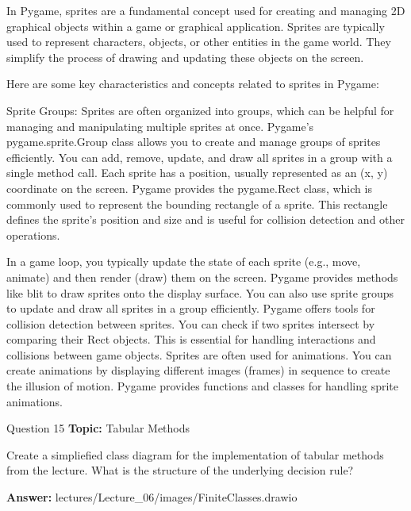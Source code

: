 \begin{frame}
    In Pygame, sprites are a fundamental concept used for creating and managing 2D graphical objects within a game or graphical application. Sprites are typically used to represent characters, objects, or other entities in the game world. They simplify the process of drawing and updating these objects on the screen.

Here are some key characteristics and concepts related to sprites in Pygame:

Sprite Groups: Sprites are often organized into groups, which can be helpful for managing and manipulating multiple sprites at once. Pygame's pygame.sprite.Group class allows you to create and manage groups of sprites efficiently. You can add, remove, update, and draw all sprites in a group with a single method call.
Each sprite has a position, usually represented as an (x, y) coordinate on the screen. Pygame provides the pygame.Rect class, which is commonly used to represent the bounding rectangle of a sprite. This rectangle defines the sprite's position and size and is useful for collision detection and other operations.
\end{frame}
\begin{frame}
    In a game loop, you typically update the state of each sprite (e.g., move, animate) and then render (draw) them on the screen. Pygame provides methods like blit to draw sprites onto the display surface. You can also use sprite groups to update and draw all sprites in a group efficiently.
    Pygame offers tools for collision detection between sprites. You can check if two sprites intersect by comparing their Rect objects. This is essential for handling interactions and collisions between game objects.
    Sprites are often used for animations. You can create animations by displaying different images (frames) in sequence to create the illusion of motion. Pygame provides functions and classes for handling sprite animations.
\end{frame}

\begin{frame}{Question 15}
    \textbf{Topic:} Tabular Methods
    \vspace{10pt}

    Create a simpliefied class diagram for the implementation of tabular methods from the lecture. What is the structure of the underlying decision rule? 
    \vspace{20pt}

    \textbf{Answer:} lectures/Lecture\_06/images/FiniteClasses.drawio
\end{frame}

